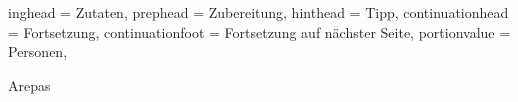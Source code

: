 \begin{otherlanguage}{ngerman}

\setHeadlines
{%
    inghead = Zutaten,
    prephead = Zubereitung,
    hinthead = Tipp,
    continuationhead = Fortsetzung,
    continuationfoot = Fortsetzung auf n\"achster Seite,
    portionvalue = Personen,
}

\begin{recipe}
[ %
    preparationtime = {\unit[20]{Minuten}},
    portion = {\portion{2}},
    source = Unkown
]
{Arepas}
    \graph
    {%
    }
    \ingredients
    {%
    }


    \hint
    {%
    }

\end{recipe}

\end{otherlanguage}
